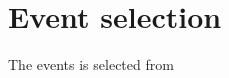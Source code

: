 

\section{Event selection}
\label{sec:EventSelection}

The events is selected from


\FloatBarrier

